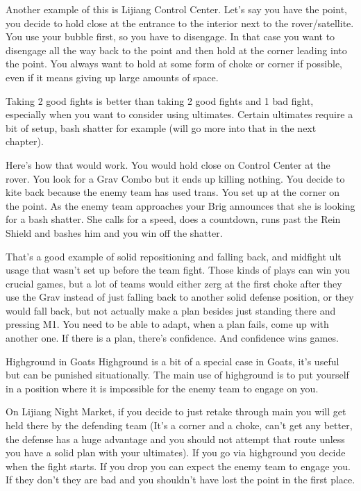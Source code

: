 Another example of this is Lijiang Control Center. Let’s say you have the point, you decide to hold close at the entrance to the interior next to the rover/satellite. You use your bubble first, so you have to disengage. In that case you want to disengage all the way back to the point and then hold at the corner leading into the point. You always want to hold at some form of choke or corner if possible, even if it means giving up large amounts of space.

Taking 2 good fights is better than taking 2 good fights and 1 bad fight, especially when you want to consider using ultimates. Certain ultimates require a bit of setup, bash shatter for example (will go more into that in the next chapter). 

Here’s how that would work. You would hold close on Control Center at the rover. You look for a Grav Combo but it ends up killing nothing. You decide to kite back because the enemy team has used trans. You set up at the corner on the point. As the enemy team approaches your Brig announces that she is looking for a bash shatter. She calls for a speed, does a countdown, runs past the Rein Shield and bashes him and you win off the shatter.

That’s a good example of solid repositioning and falling back, and midfight ult usage that wasn’t set up before the team fight. Those kinds of plays can win you crucial games, but a lot of teams would either zerg at the first choke after they use the Grav instead of just falling back to another solid defense position, or they would fall back, but not actually make a plan besides just standing there and pressing M1. You need to be able to adapt, when a plan fails, come up with another one. If there is a plan, there’s confidence. And confidence wins games.

Highground in Goats
Highground is a bit of a special case in Goats, it’s useful but can be punished situationally. The main use of highground is to put yourself in a position where it is impossible for the enemy team to engage on you.

On Lijiang Night Market, if you decide to just retake through main you will get held there by the defending team (It’s a corner and a choke, can’t get any better, the defense has a huge advantage and you should not attempt that route unless you have a solid plan with your ultimates). If you go via highground you decide when the fight starts. If you drop you can expect the enemy team to engage you. If they don’t they are bad and you shouldn’t have lost the point in the first place.

